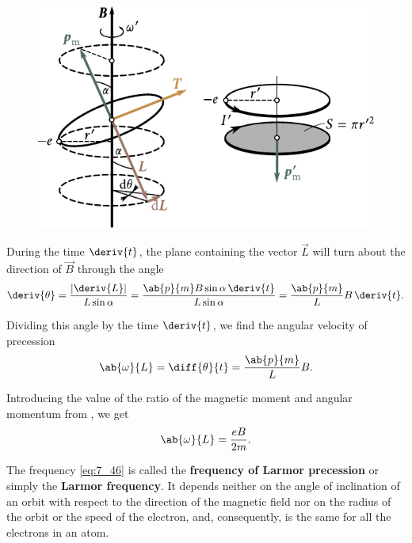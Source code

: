 \begin{figure}[!htb]
	\begin{center}
		\includegraphics[scale=1]{figures/ch_07/fig_7_14.pdf}
		\caption[]{}
		\label{fig:7_14}
	\end{center}
	\vspace{-0.8cm}
\end{figure}

During the time $\deriv{t}$, the plane containing the vector $\vec{L}$ will turn about the direction of $\vec{B}$ through the angle
\begin{equation*}
    \deriv{\theta} = \frac{|\deriv{L}|}{L\sin\alpha} = \frac{\ab{p}{m}B\sin\alpha\, \deriv{t}}{L\sin\alpha} = \frac{\ab{p}{m}}{L} B\, \deriv{t}.
\end{equation*}

\noindent
Dividing this angle by the time $\deriv{t}$, we find the angular velocity of precession
\begin{equation*}
    \ab{\omega}{L} = \diff{\theta}{t} = \frac{\ab{p}{m}}{L} B.
\end{equation*}

\noindent
Introducing the value of the ratio of the magnetic moment and angular momentum from , we get
\begin{equation}\label{eq:7_46}
    \ab{\omega}{L} = \frac{eB}{2m}.
\end{equation}

The frequency \eqref{eq:7_46} is called the \textbf{frequency of Larmor precession}
or simply the \textbf{Larmor frequency}.
It depends neither on the angle of inclination of an orbit with respect to the direction of the magnetic field nor on the radius of the orbit or the speed of the electron, and, consequently, is the same for all the electrons in an atom.

